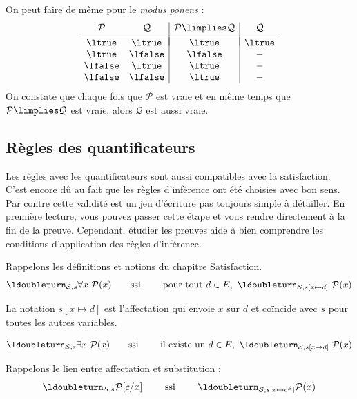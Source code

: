 \documentclass[11pt,class=report,crop=false]{standalone}
\begin{document}
On peut faire de même pour le \emph{modus ponens} :
\[
\begin{array}{c c | c | c}
	\mathcal{P}		& \mathcal{Q} 		& \mathcal{P} \limplies \mathcal{Q} 	&  \mathcal{Q} \\
	\hline
	&&&	\\[-2ex]
	\ltrue 	& \ltrue 	& \ltrue		& \ltrue \\
	\ltrue 	& \lfalse 	& \lfalse		& - \\
	\lfalse & \ltrue 	& \ltrue		& - \\	
	\lfalse & \lfalse 	& \ltrue		& - \\		
\end{array}
\]
On constate que chaque fois que $\mathcal{P}$ est vraie et en même temps que $\mathcal{P} \limplies \mathcal{Q}$ est vraie, alors $\mathcal{Q}$ est aussi vraie.


\subsection{Règles des quantificateurs}

Les règles avec les quantificateurs sont aussi compatibles avec la satisfaction.
C'est encore dû au fait que les règles d'inférence ont été choisies avec bon sens.
Par contre cette validité est un jeu d'écriture pas toujours simple à détailler. 
En première lecture, vous pouvez passer cette étape et vous rendre directement à la fin de la preuve. Cependant, étudier les preuves aide à bien comprendre les conditions d'application des règles d'inférence.


Rappelons les définitions et notions du chapitre \og{}Satisfaction\fg{}.
\[
\ldoubleturn_{\mathcal{S},s} \forall x \ \mathcal{P}(x) \text{\qquad ssi \qquad pour tout } d \in E,  \  \ldoubleturn_{\mathcal{S},s[x \mapsto d]} \ \mathcal{P}(x)
\]

La notation $s[x \mapsto d]$ est l'affectation qui envoie $x$ sur $d$ et coïncide avec $s$ pour toutes les autres variables.

\[
\ldoubleturn_{\mathcal{S},s} \exists x \ \mathcal{P}(x) \text{\qquad ssi \qquad il existe un } d \in E, \  \ldoubleturn_{\mathcal{S},s[x \mapsto d]} \ \mathcal{P}(x)
\]

Rappelons le lien entre affectation et substitution :
\[
\ldoubleturn_{\mathcal{S},s} \mathcal{P}[c/x]
\qquad \text{ ssi } \qquad
\ldoubleturn_{\mathcal{S},s[x\mapsto c^{\mathcal{S}}]} \mathcal{P}(x)
\]

\medskip
\end{document}

